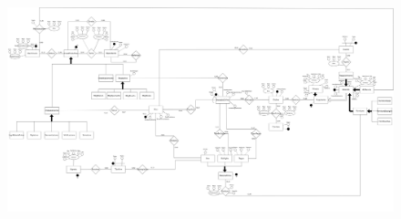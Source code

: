 \begin{figure}
    \includegraphics[width=25cm,keepaspectratio,angle=90]{src/progettazioneConcettuale/assests/cantina_ER.png}
\end{figure}